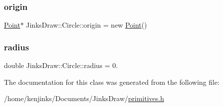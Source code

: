 \subsubsection{\texorpdfstring{origin}{origin}}
{\footnotesize\ttfamily \mbox{\hyperlink{class_jinks_draw_1_1_point}{Point}}$\ast$ Jinks\+Draw\+::\+Circle\+::origin = new \mbox{\hyperlink{class_jinks_draw_1_1_point}{Point}}()\hspace{0.3cm}{\ttfamily [private]}}

\mbox{\label{class_jinks_draw_1_1_circle_ad38af0c31ab4aa5d90aaf6cf83a60ab2}} 
\subsubsection{\texorpdfstring{radius}{radius}}
{\footnotesize\ttfamily double Jinks\+Draw\+::\+Circle\+::radius = 0.\hspace{0.3cm}{\ttfamily [private]}}



The documentation for this class was generated from the following file\+:\begin{DoxyCompactItemize}
\item 
/home/kenjinks/\+Documents/\+Jinks\+Draw/\mbox{\hyperlink{primitives_8h}{primitives.\+h}}\end{DoxyCompactItemize}
